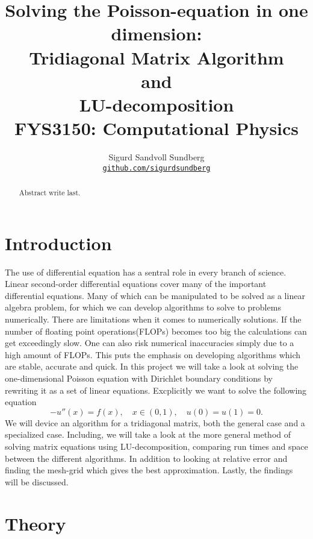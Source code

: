 \documentclass[10pt, a4paper]{amsart}
\title[Solving the Poisson-equation in one dimension]{Solving the Poisson-equation in one dimension: \\
\normalsize{Tridiagonal Matrix Algorithm\\
 and \\
 LU-decomposition} \\
  \hrulefill\small{ FYS3150: Computational Physics }\hrulefill}
\author[Sundberg]{Sigurd Sandvoll Sundberg \\
  \href{https://https://github.com/SigurdSundberg/FYS3150/}{\texttt{github.com/sigurdsundberg}}}
\begin{document}
\begin{titlepage}
\begin{abstract}
Abstract write last.
\end{abstract}
\maketitle
\tableofcontents
\end{titlepage}

\section{Introduction}
The use of differential equation has a sentral role in every branch of science. Linear second-order differential equations cover many of the important differential equations. Many of which can be manipulated to be solved as a linear algebra problem, for which we can develop algorithms to solve to problems numerically. There are limitations when it comes to numerically solutions. If the number of floating point operations(FLOPs) becomes too big the calculations can get exceedingly slow. One can also risk numerical inaccuracies simply due to a high amount of FLOPs. This puts the emphasis on developing algorithms which are stable, accurate and quick. 
In this project we will take a look at solving the one-dimensional Poisson equation with Dirichlet boundary conditions by rewriting it as a set of linear equations. Excplicitly we want to solve the following equation
\begin{equation}
-u''(x) = f(x), \quad x\in(0,1), \quad u(0)=u(1)=0.\label{eq:base}
\end{equation}
We will device an algorithm for a tridiagonal matrix, both the general case and a specialized case. Including, we will take a look at the more general method of solving matrix equations using LU-decomposition, comparing run times and space between the different algorithms. In addition to looking at relative error and finding the mesh-grid which gives the best approximation. Lastly, the findings will be discussed. 

\section{Theory}
\end{document}

